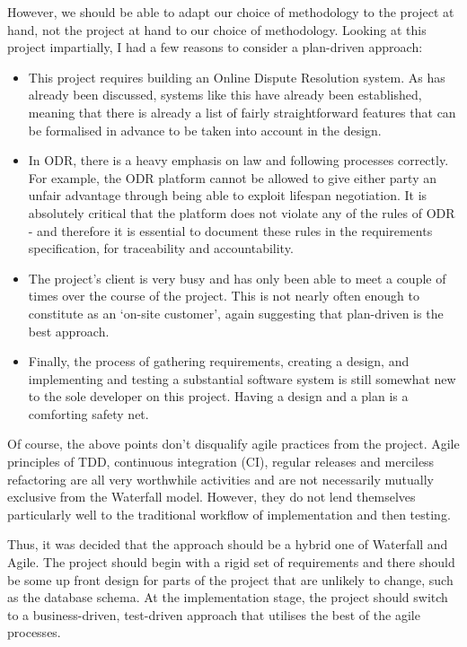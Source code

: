 However, we should be able to adapt our choice of methodology to the project at hand, not the project at hand to our choice of methodology. Looking at this project impartially, I had a few reasons to consider a plan-driven approach:

\begin{itemize}

    \item This project requires building an Online Dispute Resolution system. As has already been discussed, systems like this have already been established, meaning that there is already a list of fairly straightforward features that can be formalised in advance to be taken into account in the design.
    
    \item In ODR, there is a heavy emphasis on law and following processes correctly. For example, the ODR platform cannot be allowed to give either party an unfair advantage through being able to exploit lifespan negotiation. It is absolutely critical that the platform does not violate any of the rules of ODR - and therefore it is essential to document these rules in the requirements specification, for traceability and accountability.
    
    \item The project's client is very busy and has only been able to meet a couple of times over the course of the project. This is not nearly often enough to constitute as an `on-site customer', again suggesting that plan-driven is the best approach.
    
    \item Finally, the process of gathering requirements, creating a design, and implementing and testing a substantial software system is still somewhat new to the sole developer on this project. Having a design and a plan is a comforting safety net.

\end{itemize}

Of course, the above points don't disqualify agile practices from the project. Agile principles of TDD, continuous integration (CI), regular releases and merciless refactoring are all very worthwhile activities and are not necessarily mutually exclusive from the Waterfall model. However, they do not lend themselves particularly well to the traditional workflow of implementation and then testing.

Thus, it was decided that the approach should be a hybrid one of Waterfall and Agile. The project should begin with a rigid set of requirements and there should be some up front design for parts of the project that are unlikely to change, such as the database schema. At the implementation stage, the project should switch to a business-driven, test-driven approach that utilises the best of the agile processes.

